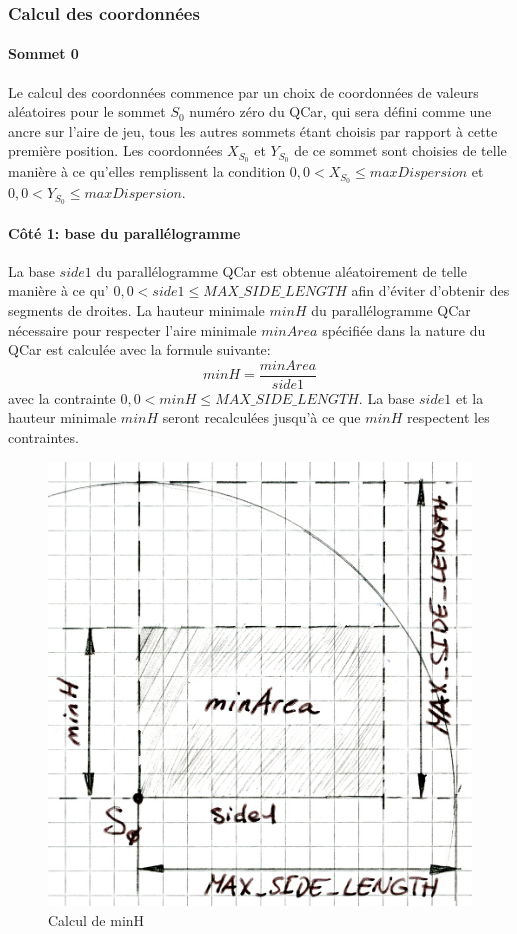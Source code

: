 \documentclass[a4paper, 12pt]{article}
\begin{document}
\subsubsection{Calcul des coordonnées}
\paragraph{Sommet 0}Le calcul des coordonnées commence par un choix de coordonnées de valeurs aléatoires pour le sommet $S_{0}$ numéro zéro du QCar, qui sera défini comme une ancre sur l'aire de jeu, tous les autres sommets étant choisis par rapport à cette première position. Les coordonnées $ X_{S_{0}} $ et $ Y_{S_{0}} $ de ce sommet sont choisies de telle manière à ce qu'elles remplissent la condition $0,0 < X_{S_{0}} \le maxDispersion $ et $0,0 < Y_{S_{0}} \le maxDispersion $.
\paragraph{Côté 1: base du parallélogramme}La base $\mathit{side1}$ du parallélogramme QCar est obtenue aléatoirement de telle manière à ce qu’ $0,0 < \mathit{side1} \le MAX\_SIDE\_LENGTH $ afin d'éviter d'obtenir des segments de droites.
La hauteur minimale $minH$ du parallélogramme QCar nécessaire pour respecter l'aire minimale $minArea$ spécifiée dans la nature du QCar est calculée avec la formule suivante:
\[ minH = \frac{minArea}{\mathit{side1}} \]
avec la contrainte $0,0 < minH \le MAX\_SIDE\_LENGTH $. 
La base $\mathit{side1}$ et la hauteur minimale $minH$ seront recalculées jusqu'à ce que $minH$ respectent les contraintes.
\begin{figure}[h!]
 \centering
 \includegraphics[width=0.4\linewidth]{includes/images/creaQCar1}
 \caption{Calcul de minH}
 \label{fig:creaqcar1}
\end{figure}
\end{document}
